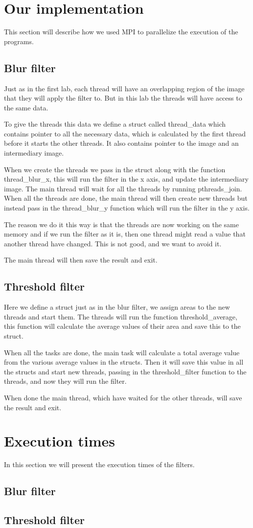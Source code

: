 \documentclass[titlepage, a4paper]{article}
\begin{document}
\section{Our implementation}
This section will describe how we used MPI to parallelize the execution of the programs.

\subsection{Blur filter}
Just as in the first lab, each thread will have an overlapping region of the image that they will apply the filter to. But in this lab the threads will have access to the same data.

To give the threads this data we define a struct called thread\_data which contains pointer to all the necessary data, which is calculated by the first thread before it starts the other threads. It also contains pointer to the image and an intermediary image.

When we create the threads we pass in the struct along with the function thread\_blur\_x, this will run the filter in the x axis, and update the intermediary image. The main thread will wait for all the threads by running pthreads\_join. When all the threads are done, the main thread will then create new threads but instead pass in the thread\_blur\_y function which will run the filter in the y axis.

The reason we do it this way is that the threads are now working on the same memory and if we run the filter as it is, then one thread might read a value that another thread have changed. This is not good, and we want to avoid it.

The main thread will then save the result and exit.

\subsection{Threshold filter}
Here we define a struct just as in the blur filter, we assign areas to the new threads and start them. The threads will run the function threshold\_average, this function will calculate the average values of their area and save this to the struct.

When all the tasks are done, the main task will calculate a total average value from the various average values in the structs. Then it will save this value in all the structs and start new threads, passing in the threshold\_filter function to the threads, and now they will run the filter.

When done the main thread, which have waited for the other threads, will save the result and exit.

\section{Execution times}
In this section we will present the execution times of the filters.

\subsection{Blur filter}


\subsection{Threshold filter}
\end{document}
